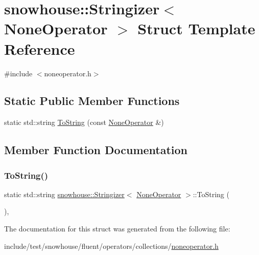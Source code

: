 \hypertarget{structsnowhouse_1_1Stringizer_3_01NoneOperator_01_4}{}\section{snowhouse\+::Stringizer$<$ None\+Operator $>$ Struct Template Reference}
\label{structsnowhouse_1_1Stringizer_3_01NoneOperator_01_4}


{\ttfamily \#include $<$noneoperator.\+h$>$}

\subsection*{Static Public Member Functions}
\begin{DoxyCompactItemize}
\item 
static std\+::string \mbox{\hyperlink{structsnowhouse_1_1Stringizer_3_01NoneOperator_01_4_acccfa96b9b95d0cc4b4e1f4b9af06e2c}{To\+String}} (const \mbox{\hyperlink{structsnowhouse_1_1NoneOperator}{None\+Operator}} \&)
\end{DoxyCompactItemize}


\subsection{Member Function Documentation}
\mbox{\label{structsnowhouse_1_1Stringizer_3_01NoneOperator_01_4_acccfa96b9b95d0cc4b4e1f4b9af06e2c}} 
\subsubsection{\texorpdfstring{ToString()}{ToString()}}
{\footnotesize\ttfamily static std\+::string \mbox{\hyperlink{structsnowhouse_1_1Stringizer}{snowhouse\+::\+Stringizer}}$<$ \mbox{\hyperlink{structsnowhouse_1_1NoneOperator}{None\+Operator}} $>$\+::To\+String (\begin{DoxyParamCaption}\item[{const \mbox{\hyperlink{structsnowhouse_1_1NoneOperator}{None\+Operator}} \&}]{ }\end{DoxyParamCaption})\hspace{0.3cm}{\ttfamily [inline]}, {\ttfamily [static]}}



The documentation for this struct was generated from the following file\+:\begin{DoxyCompactItemize}
\item 
include/test/snowhouse/fluent/operators/collections/\mbox{\hyperlink{noneoperator_8h}{noneoperator.\+h}}\end{DoxyCompactItemize}
